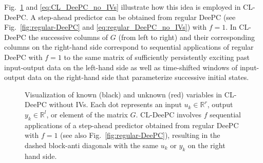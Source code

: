 Fig.~\ref{fig:CL-DeePC} and \eqref{eq:CL_DeePC_no_IVs} illustrate how this idea is employed in \ac{CL-DeePC}. A step-ahead predictor can be obtained from regular \ac{DeePC} (see Fig.~\ref{fig:regular-DeePC} and \eqref{eq:regular_DeePC_no_IVs}) with $f=1$. In \ac{CL-DeePC} the successive columns of $G$ (from left to right) and their corresponding columns on the right-hand side correspond to sequential applications of regular \ac{DeePC} with $f=1$ to the same matrix of sufficiently persistently exciting past input-output data on the left-hand side as well as time-shifted windows of input-output data on the right-hand side that parameterize successive initial states.
%
%          
%          
\begin{figure}[b!]
\centering

\caption{Visualization of known (black) and unknown (red) variables in \ac{CL-DeePC} without \ac{IVs}. Each dot represents an input $u_k\in\mathbb{R}^r$, output $y_k\in\mathbb{R}^l$, or element of the matrix $G$. \ac{CL-DeePC} involves $f$ sequential applications of a step-ahead predictor obtained from regular \ac{DeePC} with $f=1$ (see also Fig.~\ref{fig:regular-DeePC}), resulting in the dashed block-anti diagonals with the same $u_k$ or $y_k$ on the right hand side.}
\label{fig:CL-DeePC}
\end{figure}
